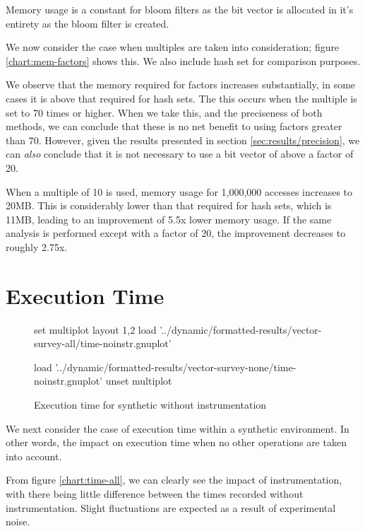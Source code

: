 Memory usage is a constant for bloom filters as the bit vector is allocated in it's entirety as the bloom filter is created.

We now consider the case when multiples are taken into consideration; figure \ref{chart:mem-factors} shows this. We also include hash set for comparison purposes.

We observe that the memory required for factors increases substantially, in some cases it is above that required for hash sets. The this occurs when the multiple is set to 70 times or higher. When we take this, and the preciseness of both methods, we can conclude that these is no net benefit to using factors greater than 70. However, given the results presented in section \ref{sec:results/precision}, we can \emph{also} conclude that it is not necessary to use a bit vector of above a factor of 20.

When a multiple of 10 is used, memory usage for 1,000,000 accesses increases to 20MB. This is considerably lower than that required for hash sets, which is 11MB, leading to an improvement of 5.5x lower memory usage. If the same analysis is performed except with a factor of 20, the improvement decreases to roughly 2.75x.

\section{Execution Time} \label{sec:results/time}
\begin{figure}
	\centering
	\begin{gnuplot}[terminal=pdf]
	set multiplot layout 1,2
		load '../dynamic/formatted-results/vector-survey-all/time-noinstr.gnuplot'
		
		load '../dynamic/formatted-results/vector-survey-none/time-noinstr.gnuplot'
	unset multiplot
	\end{gnuplot}
	\caption{Execution time for synthetic without instrumentation}
	\label{chart:time-none-noinstr}
\end{figure}

We next consider the case of execution time within a synthetic environment. In other words, the impact on execution time when no other operations are taken into account.

From figure \ref{chart:time-all}, we can clearly see the impact of instrumentation, with there being little difference between the times recorded without instrumentation. Slight fluctuations are expected as a result of experimental noise.

